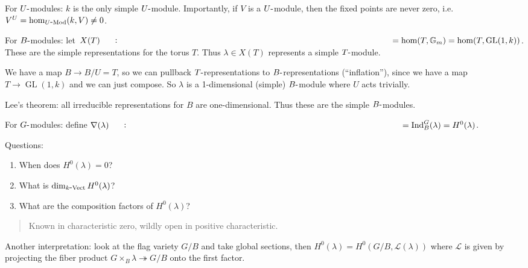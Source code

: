 For \(U{\hbox{-}}\)modules: \(k\) is the only simple
\(U{\hbox{-}}\)module. Importantly, if \(V\) is a \(U{\hbox{-}}\)module,
then the fixed points are never zero,
i.e.~\(V^U = \hom_{U{\hbox{-}}\text{Mod}}(k, V) \neq 0\).

For \(B{\hbox{-}}\)modules: let
\(X(T) \mathrel{\vcenter{:}}=\hom(T, {\mathbb{G}}_m) = \hom(T, \operatorname{GL}(1, k))\).
These are the simple representations for the torus \(T\). Thus
\(\lambda \in X(T)\) represents a simple \(T{\hbox{-}}\)module.

We have a map \(B \to B/U = T\), so we can pullback
\(T{\hbox{-}}\)representations to \(B{\hbox{-}}\)representations
(``inflation''), since we have a map \(T\to \operatorname{GL}(1, k)\)
and we can just compose. So \(\lambda\) is a 1-dimensional (simple)
\(B{\hbox{-}}\)module where \(U\) acts trivially.

Lee's theorem: all irreducible representations for \(B\) are
one-dimensional. Thus these are the simple \(B{\hbox{-}}\)modules.

For \(G{\hbox{-}}\)modules: define
\(\nabla(\lambda) \mathrel{\vcenter{:}}=\operatorname{Ind}_B^G(\lambda) = H^0(\lambda)\).

Questions:

\begin{enumerate}
\def\labelenumi{\arabic{enumi}.}
\tightlist
\item
  When does \(H^0(\lambda) = 0\)?
\item
  What is \(\dim_{k{\hbox{-}}\text{Vect}} H^0(\lambda)\)?
\item
  What are the composition factors of \(H^0(\lambda)\)?
\end{enumerate}

\begin{quote}
Known in characteristic zero, wildly open in positive characteristic.
\end{quote}

\begin{remark}

\begin{remark}

Another interpretation: look at the flag variety \(G/B\) and take global
sections, then \(H^0(\lambda) = H^0(G/B, \mathcal{L}(\lambda))\) where
\(\mathcal{L}\) is given by projecting the fiber product
\(G \times_B \lambda \twoheadrightarrow G/B\) onto the first factor.

\end{remark}

\end{remark}


